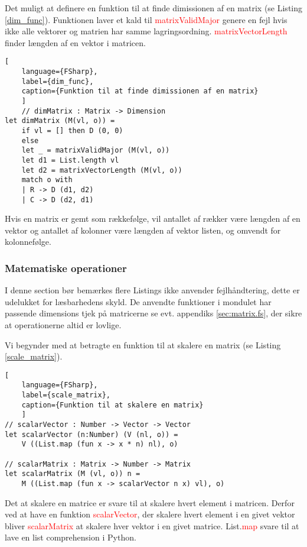 Det muligt at definere en funktion til at finde dimissionen af en matrix (se Listing \ref{dim_func}). Funktionen laver et kald til \textcolor{red}{matrixValidMajor} genere en fejl hvis ikke alle vektorer og matrien har samme lagringsordning. \textcolor{red}{matrixVectorLength} finder længden af en vektor i matricen.

\begin{lstlisting}[
    language={FSharp}, 
    label={dim_func}, 
    caption={Funktion til at finde dimissionen af en matrix}
    ]
    // dimMatrix : Matrix -> Dimension
let dimMatrix (M(vl, o)) =
    if vl = [] then D (0, 0)
    else
    let _ = matrixValidMajor (M(vl, o))
    let d1 = List.length vl
    let d2 = matrixVectorLength (M(vl, o))
    match o with
    | R -> D (d1, d2)
    | C -> D (d2, d1)
\end{lstlisting}

Hvis en matrix er gemt som rækkefølge, vil antallet af rækker være længden af en vektor og antallet af kolonner være længden af vektor listen, og omvendt for kolonnefølge.

\subsubsection{Matematiske operationer}
I denne section bør bemærkes flere Listings ikke anvender fejlhåndtering, dette er udelukket for læsbarhedens skyld. De anvendte funktioner i mondulet har passende dimensions tjek på matricerne se evt. appendiks \ref{sec:matrix.fs}, der sikre at operationerne altid er lovlige.

Vi begynder med at betragte en funktion til at skalere en matrix (se Listing \ref{scale_matrix}). 

\begin{lstlisting}[
    language={FSharp}, 
    label={scale_matrix}, 
    caption={Funktion til at skalere en matrix}
    ]
// scalarVector : Number -> Vector -> Vector
let scalarVector (n:Number) (V (nl, o)) = 
    V ((List.map (fun x -> x * n) nl), o)

// scalarMatrix : Matrix -> Number -> Matrix
let scalarMatrix (M (vl, o)) n = 
    M ((List.map (fun x -> scalarVector n x) vl), o)
\end{lstlisting}

Det at skalere en matrice er svare til at skalere hvert element i matricen. Derfor ved at have en funktion \textcolor{red}{scalarVector}, der skalere hvert element i en givet vektor bliver \textcolor{red}{scalarMatrix} at skalere hver vektor i en givet matrice. List.\textcolor{red}{map} svare til at lave en list comprehension i Python.


